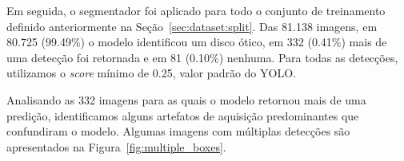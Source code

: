 \documentclass[12pt]{article}
\begin{document}
Em seguida, o segmentador foi aplicado para todo o conjunto de treinamento definido anteriormente na Seção~\ref{sec:dataset:split}. Das 81.138 imagens, em 80.725 (99.49\%) o modelo identificou um disco ótico, em 332 (0.41\%) mais de uma detecção foi retornada e em 81 (0.10\%) nenhuma. Para todas as detecções, utilizamos o \emph{score} mínimo de 0.25, valor padrão do YOLO.

Analisando as 332 imagens para as quais o modelo retornou mais de uma predição, identificamos alguns artefatos de aquisição predominantes que confundiram o modelo. Algumas imagens com múltiplas detecções são apresentados na Figura~\ref{fig:multiple_boxes}.
\end{document}
